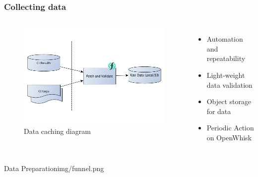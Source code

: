 \documentclass[aspectratio=169,11pt,hyperref={colorlinks=true}]{beamer}
\begin{document}
\begin{frame}
    \frametitle{Collecting data}
    \begin{columns}
        \begin{figure}
        \begin{center}
          \includegraphics[width=1\textwidth]{diagrams/cache-data.png}
             \caption{Data caching diagram}
        \end{center}
        \end{figure}
        \begin{itemize}
            \item{Automation and repeatability}
            \item{Light-weight data validation}
            \item{Object storage for data}
            \item{Periodic Action on OpenWhisk}
        \end{itemize}
    \end{columns}
\end{frame}

\begin{sectionpic}
{Data Preparation}{img/funnel.png}
\end{sectionpic}
\end{document}
